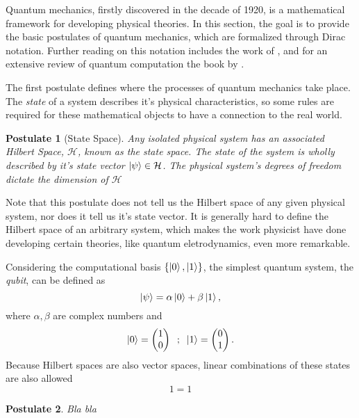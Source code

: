 \documentclass[../../dissertation.tex]{subfiles}
\newtheorem{post}{Postulate}
\begin{document}
Quantum mechanics, firstly discovered in the decade of 1920, is a mathematical
framework for developing physical theories. In this section, the goal is to
provide the basic postulates of quantum mechanics, which are formalized through
Dirac notation. Further reading on this notation includes the work of
\cite{sakurai1994}, and for an extensive review of quantum computation the
book by \cite{nielsen2011}.\par  
The first postulate defines where the processes of quantum mechanics take
place. The \textit{state} of a system describes it's physical characteristics,
so some rules are required for these mathematical objects to have a connection
to the real world.
\begin{post}[State Space] 
	Any isolated physical system has an associated Hilbert Space,
	$\mathcal{H}$, known as the state space. The state of the system is
	wholly described by it's state vector $\ket{\psi} \in \mathcal{H}$. The
	physical system's degrees of freedom dictate the dimension of
	$\mathcal{H}$
\end{post}
Note that this postulate does not tell us the Hilbert space of any given
physical system, nor does it tell us it's state vector. It is generally hard to
define the Hilbert space of an arbitrary system, which makes the work physicist
have done developing certain theories, like quantum eletrodynamics, even more
remarkable.\par 
Considering the computational basis $\{\ket{0},\ket{1}\}$, the simplest quantum
system, the \textit{qubit}, can be defined as 
\begin{equation}
	\ket{\psi} = \alpha \ket{0} + \beta \ket{1},
\end{equation}
where $\alpha,\beta$ are complex numbers and
\begin{equation}
	\ket{0} = \begin{pmatrix} 1 \\0 \end{pmatrix}  \; \; ;  \;  \;  \ket{1} = \begin{pmatrix} 0 \\1 \end{pmatrix}.
\end{equation}
Because Hilbert spaces are also vector spaces, linear combinations of these
states are also allowed 
\begin{equation}
1=1
\end{equation}

\begin{post}
	Bla bla
\end{post}
\end{document}
